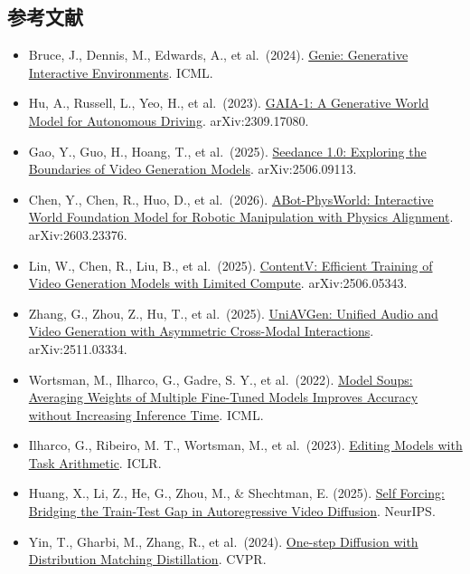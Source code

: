 \hypertarget{ux53c2ux8003ux6587ux732e-139}{%
\subsection{参考文献}\label{ux53c2ux8003ux6587ux732e-139}}

\vspace{0.25em}
\begin{itemize}
\tightlist
\item
  Bruce, J., Dennis, M., Edwards, A., et al.~(2024). \href{https://arxiv.org/abs/2402.15391}{Genie: Generative Interactive Environments}. ICML.
\item
  Hu, A., Russell, L., Yeo, H., et al.~(2023). \href{https://arxiv.org/abs/2309.17080}{GAIA-1: A Generative World Model for Autonomous Driving}. arXiv:2309.17080.
\item
  Gao, Y., Guo, H., Hoang, T., et al.~(2025). \href{https://arxiv.org/abs/2506.09113}{Seedance 1.0: Exploring the Boundaries of Video Generation Models}. arXiv:2506.09113.
\item
  Chen, Y., Chen, R., Huo, D., et al.~(2026). \href{https://arxiv.org/abs/2603.23376}{ABot-PhysWorld: Interactive World Foundation Model for Robotic Manipulation with Physics Alignment}. arXiv:2603.23376.
\item
  Lin, W., Chen, R., Liu, B., et al.~(2025). \href{https://arxiv.org/abs/2506.05343}{ContentV: Efficient Training of Video Generation Models with Limited Compute}. arXiv:2506.05343.
\item
  Zhang, G., Zhou, Z., Hu, T., et al.~(2025). \href{https://arxiv.org/abs/2511.03334}{UniAVGen: Unified Audio and Video Generation with Asymmetric Cross-Modal Interactions}. arXiv:2511.03334.
\item
  Wortsman, M., Ilharco, G., Gadre, S. Y., et al.~(2022). \href{https://arxiv.org/abs/2203.05482}{Model Soups: Averaging Weights of Multiple Fine-Tuned Models Improves Accuracy without Increasing Inference Time}. ICML.
\item
  Ilharco, G., Ribeiro, M. T., Wortsman, M., et al.~(2023). \href{https://arxiv.org/abs/2212.04089}{Editing Models with Task Arithmetic}. ICLR.
\item
  Huang, X., Li, Z., He, G., Zhou, M., \& Shechtman, E. (2025). \href{https://arxiv.org/abs/2506.08009}{Self Forcing: Bridging the Train-Test Gap in Autoregressive Video Diffusion}. NeurIPS.
\item
  Yin, T., Gharbi, M., Zhang, R., et al.~(2024). \href{https://arxiv.org/abs/2311.18828}{One-step Diffusion with Distribution Matching Distillation}. CVPR.

\end{itemize}
